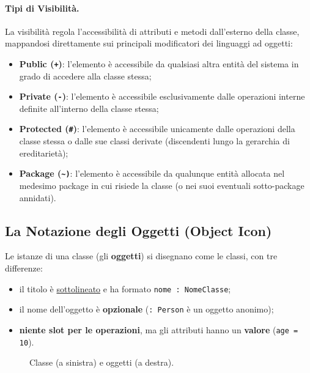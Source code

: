 \documentclass[12pt]{extarticle}
\newcommand{\cn}[1]{\makebox[\linewidth][c]{\textbf{#1}}}
\begin{document}
\paragraph{Tipi di Visibilità.}
La visibilità regola l'accessibilità di attributi e metodi dall'esterno della classe, mappandosi direttamente sui principali modificatori dei linguaggi ad oggetti:
\begin{itemize}
    \item \textbf{Public (\texttt{+})}: l'elemento è accessibile da qualsiasi altra entità del sistema in grado di accedere alla classe stessa;
    \item \textbf{Private (\texttt{-})}: l'elemento è accessibile esclusivamente dalle operazioni interne definite all'interno della classe stessa;
    \item \textbf{Protected (\texttt{\#})}: l'elemento è accessibile unicamente dalle operazioni della classe stessa o dalle sue classi derivate (discendenti lungo la gerarchia di ereditarietà);
    \item \textbf{Package (\texttt{\~{})}}: l'elemento è accessibile da qualunque entità allocata nel medesimo package in cui risiede la classe (o nei suoi eventuali sotto-package annidati).
\end{itemize}

\subsection{La Notazione degli Oggetti (Object Icon)}

\noindent Le istanze di una classe (gli \textbf{oggetti}) si disegnano come le classi, con tre differenze:
\begin{itemize}
    \item il titolo è \underline{sottolineato} e ha formato \texttt{nome : NomeClasse};
    \item il nome dell'oggetto è \textbf{opzionale} (\texttt{: Person} è un oggetto anonimo);
    \item \textbf{niente slot per le operazioni}, ma gli attributi hanno un \textbf{valore} (\texttt{age = 10}).
\end{itemize}

\begin{figure}[H]
    \centering
{}
    \caption{Classe (a sinistra) e oggetti (a destra).}
\end{figure}
\end{document}
